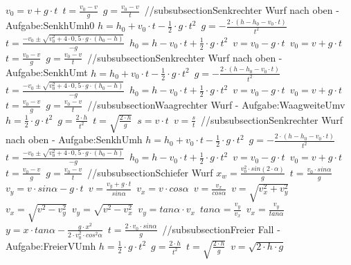 $ v_{0}  = v + g\cdot t $\ 
$ t = \frac{v_{0} -v}{  g} $\ 
$ g = \frac{v_{0}  - v}{  t} $\ 
//subsubsection{Senkrechter Wurf nach oben  - Aufgabe:SenkhUmh0} 
$ h = h_{0}  + v_{0} \cdot t - \frac{1}{2}\cdot g\cdot t^{2} $\ 
$ g = - \frac{2\cdot (h - h_{0}  - v_{0} \cdot t)}{     t^{2} } $\ 
$ t = \frac{-v_{0}  \pm \sqrt{v_{0} ^{2} +4\cdot 0,5\cdot g\cdot (h_{0}  -h)}}{      -g} $\ 
$ h_{0}  = h - v_{0} \cdot t + \frac{1}{2}\cdot g\cdot t^{2} $\ 
$ v = v_{0}  - g\cdot t $\ 
$ v_{0}  = v + g\cdot t $\ 
$ t = \frac{v_{0} -v}{  g} $\ 
$ g = \frac{v_{0}  - v}{  t} $\ 
//subsubsection{Senkrechter Wurf nach oben  - Aufgabe:SenkhUmt} 
$ h = h_{0}  + v_{0} \cdot t - \frac{1}{2}\cdot g\cdot t^{2} $\ 
$ g = - \frac{2\cdot (h - h_{0}  - v_{0} \cdot t)}{     t^{2} } $\ 
$ t = \frac{-v_{0}  \pm \sqrt{v_{0} ^{2} +4\cdot 0,5\cdot g\cdot (h_{0}  -h)}}{      -g} $\ 
$ h_{0}  = h - v_{0} \cdot t + \frac{1}{2}\cdot g\cdot t^{2} $\ 
$ v = v_{0}  - g\cdot t $\ 
$ v_{0}  = v + g\cdot t $\ 
$ t = \frac{v_{0} -v}{  g} $\ 
$ g = \frac{v_{0}  - v}{  t} $\ 
//subsubsection{Waagrechter Wurf - Aufgabe:WaagweiteUmv} 
$ h = \frac{1}{2}\cdot g\cdot t^{2} $\ 
$ g = \frac{2\cdot h}{t^{2} } $\ 
$ t = \sqrt{\frac{2\cdot h}{g}} $\ 
$ s = v\cdot t $\ 
$ v = \frac{s}{t} $\ 
//subsubsection{Senkrechter Wurf nach oben  - Aufgabe:SenkhUmh} 
$ h = h_{0}  + v_{0} \cdot t - \frac{1}{2}\cdot g\cdot t^{2} $\ 
$ g = - \frac{2\cdot (h - h_{0}  - v_{0} \cdot t)}{     t^{2} } $\ 
$ t = \frac{-v_{0}  \pm \sqrt{v_{0} ^{2} +4\cdot 0,5\cdot g\cdot (h_{0}  -h)}}{      -g} $\ 
$ h_{0}  = h - v_{0} \cdot t + \frac{1}{2}\cdot g\cdot t^{2} $\ 
$ v = v_{0}  - g\cdot t $\ 
$ v_{0}  = v + g\cdot t $\ 
$ t = \frac{v_{0} -v}{  g} $\ 
$ g = \frac{v_{0}  - v}{  t} $\ 
//subsubsection{Schiefer Wurf} 
$ x_{w}  = \frac{v_{0} ^{2} \cdot sin(2\cdot \alpha )}{       g} $\ 
$ t =\frac{v_{0} \cdot sin \alpha }{  g} $\ 
$ v_{y}  =  v\cdot sin\alpha - g\cdot t $\ 
$ v= \frac{ v_{y} +g\cdot t}{ sin\alpha } $\ 
$ v_{x}  = v\cdot  cos\alpha $\ 
$ v= \frac{ v_{x} }{ cos\alpha } $\ 
$ v= \sqrt{ v_{x} ^{2} + v_{y} ^{2} } $\ 
$ v_{x} = \sqrt{ v^{2}  - v_{y} ^{2} } $\ 
$ v_{y} = \sqrt{ v^{2}  - v_{x} ^{2} } $\ 
$ v_{y} = tan \alpha \cdot  v_{x} $\ 
$ tan \alpha = \frac{v_{y} }{v_{x} } $\ 
$ v_{x} = \frac{v_{y} }{tan \alpha } $\ 
$ y = x\cdot tan \alpha  - \frac{   g\cdot x^{2} }{2\cdot v^{2} _{0} \cdot cos ^{2}\alpha } $\ 
$ t =\frac{2\cdot v_{0} \cdot sin \alpha }{ g} $\ 
//subsubsection{Freier Fall - Aufgabe:FreierVUmh} 
$ h = \frac{1}{2}\cdot g\cdot t^{2} $\ 
$ g = \frac{2\cdot h}{ t^{2} } $\ 
$ t = \sqrt{\frac{2\cdot h}{g}} $\ 
$ v = \sqrt{2\cdot h\cdot g} $\ 
